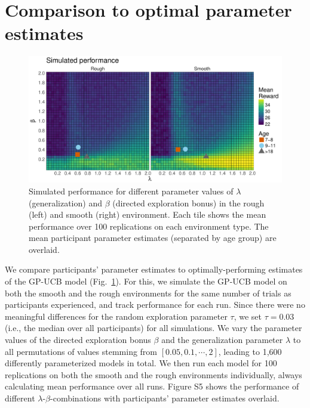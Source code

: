 \section*{Comparison to optimal parameter estimates}
\begin{figure}[ht!]
\centering
\includegraphics[width=0.9\linewidth]{simperf.pdf}
\caption{Simulated performance for different parameter values of $\lambda$ (generalization) and $\beta$ (directed exploration bonus) in the rough (left) and smooth (right) environment. Each tile shows the mean performance over 100 replications on each environment type. The mean participant parameter estimates (separated by age group) are overlaid.} 
\label{fig:optimalparams}
\vspace{-1mm}
\end{figure}

We compare participants' parameter estimates to optimally-performing estimates of the GP-UCB model (Fig.~\ref{fig:optimalparams}). For this, we simulate the GP-UCB model on both the smooth and the rough environments for the same number of trials as participants experienced, and track performance for each run. Since there were no meaningful differences for the random exploration parameter $\tau$, we set $\tau=0.03$ (i.e., the median over all participants) for all simulations. We vary the parameter values of the directed exploration bonus $\beta$ and the generalization parameter $\lambda$ to all permutations of values stemming from $[0.05,0.1,\cdots, 2]$, leading to 1,600 differently parameterized models in total. We then run each model for 100 replications on both the smooth and the rough environments individually, always calculating mean performance over all runs. Figure S5 shows the performance of different $\lambda$-$\beta$-combinations with participants' parameter estimates overlaid.


